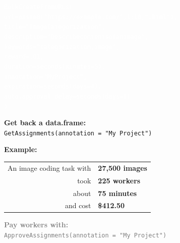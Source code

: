 \documentclass[14pt]{beamer}
\begin{document}
\bgroup
{}
\begin{frame}
\small
\begin{alltt}
\textcolor{white}{BulkCreateFromURLs(}\\
\textcolor{white}{\hspace{0.5em}  url = paste0("https://example.com/",1:10,".html"),}\\

\textcolor{white}{\hspace{0.5em}  title = "Image Categorization",}\\
\textcolor{white}{\hspace{0.5em}  description = "Describe contents of an image",}\\
\textcolor{white}{\hspace{0.5em}  keywords = "categorization, image",}\\
\textcolor{white}{\hspace{0.5em}  reward = .01,}\\
\textcolor{white}{\hspace{0.5em}  duration = seconds(minutes = 5),}\\

\textcolor{white}{\hspace{0.5em}  annotation = "My Project",}\\
\textcolor{white}{\hspace{0.5em}  expiration = seconds(days = 4),}\\
\textcolor{white}{\hspace{0.5em}  auto.approval.delay = seconds(days = 1)}\\
\textcolor{white}{)}
\end{alltt}
\end{frame}
\egroup


\begin{frame}[fragile]
\textbf{Get back a data.frame:}\\
\vspace{1em}
\texttt{GetAssignments(annotation = "My Project")}\\
\vspace{1em}
\def\arraystretch{1.5}

\textbf{Example:}
\begin{tabular}{rl}
An image coding task with & \textbf{27,500 images}\\
                      took & \textbf{225 workers}\\
                     about & \textbf{75 minutes}\\
                  and cost & \textbf{\$412.50}\\
\end{tabular}

\vspace{1em}
{\small \textcolor{gray}{\textbf{Pay workers with:}\\ \texttt{ApproveAssignments(annotation = "My Project")}}}
\end{frame}
\end{document}
